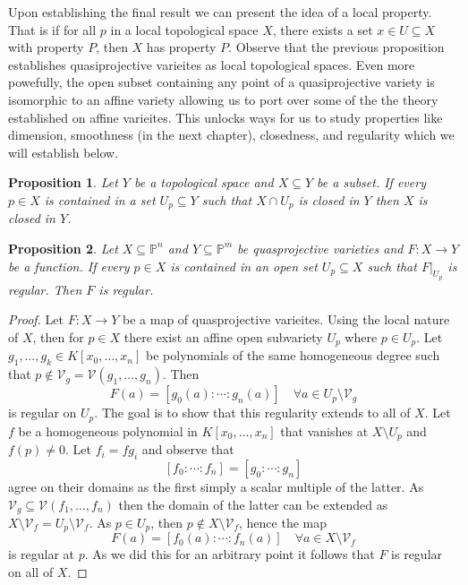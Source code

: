 \documentclass[40pt]{article}
\newcommand{\Proj}{\mathbb{P}}
\newcommand{\V}{\mathcal{V}}
\newtheorem{proposition}{Proposition}[section]
\theoremstyle{remark}
\begin{document}
			Upon establishing the final result we can present the idea of a local property. That is if for all $p$ in a local topological space $X$, there exists a set $x \in U \subseteq X$ with property $P$, then $X$ has property $P$.  Observe that the previous proposition establishes quasiprojective varieites as local topological spaces. Even more powefully, the open subset containing any point of a quasiprojective variety is isomorphic to an affine variety allowing us to port over some of the the theory established on affine varieites. This unlocks ways for us to study properties like dimension, smoothness (in the next chapter), closedness, and regularity which we will establish below.
			\begin{proposition}
				Let $Y$ be a topological space and $X \subseteq Y$ be a subset. If every $p \in X$ is contained in a set $U_p \subseteq Y$ such that $X \cap U_p$ is closed in $Y$ then $X$ is closed in $Y$.
			\end{proposition}
			\begin{proposition}
				Let $X \subseteq \Proj^n$ and $Y \subseteq \Proj^m$ be quasprojective varieties and $F :X \to Y$ be a function. If every $ p\in X$ is contained in an open set $U_p \subseteq X$ such that $F|_{U_p}$ is regular. Then $F$ is regular. 
			\end{proposition}
			\begin{proof}
				Let $F : X \to Y$ be a map of quasprojective varieites. Using the local nature of $X$, then for $p \in X$ there exist an affine open subvariety $U_p$ where $p \in U_p$. Let $g_1,\dots,g_k \in K[x_0,\dots,x_n]$ be polynomials of the same homogeneous degree such that $ p \not \in \V_g = \V(g_1,\dots,g_n)$. Then 
				\[
				F(a) = [g_0(a) : \cdots : g_n(a)] \quad \forall a \in U_p \setminus \V_g
				\]
				is regular on $U_p$. The goal is to show that this regularity extends to all of $X$. Let $f$ be a homogeneous polynomial in $K[x_0,\dots,x_n]$ that vanishes at $X \setminus U_p$ and $f(p) \neq 0$. Let $f_i = fg_i$ and observe that 
				\[
				[f_0: \cdots:f_n] = [g_0:\cdots:g_n]
				\]
				agree on their domains as the first simply a scalar multiple of the latter. As $\V_g \subseteq \V(f_1,\dots,f_n)$ then the domain of the latter can be extended as $X \setminus \V_f = U_p \setminus \V_f$. As $p \in U_p$, then $p \not  \in X \setminus \V_f$, hence the map
				\[
				F(a) = [f_0(a):\cdots:f_n(a)]\quad\forall a \in X \setminus \V_f
				\]
				is regular at $p$. As we did this for an arbitrary point it follows that $F$ is regular on all of $X$. 
			\end{proof}
			
\end{document}
